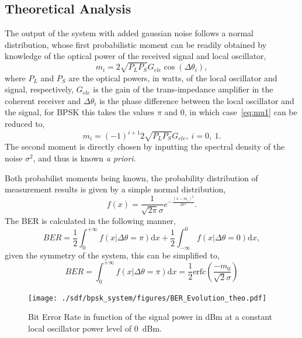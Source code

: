 \begin{refsection}
\subsection{Theoretical Analysis}

The output of the system with added gaussian noise follows a normal distribution, whose first probabilistic moment can be readily obtained by knowledge of the optical power of the received signal and local oscillator,
\begin{equation}\label{eq:mu1}
m_i=2\sqrt{P_LP_S}G_{ele}\cos(\Delta\theta_i),
\end{equation}
where $P_L$ and $P_S$ are the optical powers, in watts, of the local oscillator and signal, respectively, $G_{ele}$ is the gain of the trans-impedance amplifier in the coherent receiver and $\Delta\theta_i$ is the phase difference between the local oscillator and the signal, for BPSK this takes the values $\pi$ and 0, in which case~\eqref{eq:mu1} can be reduced to,
\begin{equation}
m_i=(-1)^{i+1}2\sqrt{P_LP_S}G_{ele},~i=0,~1.
\end{equation}
The second moment is directly chosen by inputting the spectral density of the noise $\sigma^2$, and thus is known \textit{a priori}.
\par
Both probabilist moments being known, the probability distribution of measurement results is given by a simple normal distribution,
\begin{equation}
f(x)=\frac{1}{\sqrt{2\pi}\sigma}e^{-\frac{(x-m_i)^2}{2\sigma^2}}.
\end{equation}
The BER is calculated in the following manner,
\begin{equation}
BER=\frac{1}{2}\int_0^{+\infty}f(x|\Delta\theta=\pi)\text{d}x+\frac{1}{2}\int^0_{-\infty}f(x|\Delta\theta=0)\text{d}x,
\end{equation}
given the symmetry of the system, this can be simplified to,
\begin{equation}\label{eq:BERtheoretical}
BER=\int_0^{+\infty}f(x|\Delta\theta=\pi)\text{d}x=\frac{1}{2}\text{erfc}\left(\frac{-m_0}{\sqrt{2}\sigma}\right)
\end{equation}

\begin{figure}[H]
\centering
\texttt{[image: ./sdf/bpsk\_system/figures/BER\_Evolution\_theo.pdf]}
\caption{Bit Error Rate in function of the signal power in dBm at a constant local oscillator power level of 0~dBm.}
\label{fig:berevolution}
\end{figure}


\end{refsection}
